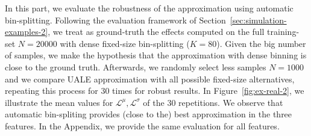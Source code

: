 \documentclass[twoside]{article}
\begin{document}
In this part, we evaluate the robustness of the approximation using
automatic bin-splitting. Following the evaluation framework of
Section~\ref{sec:simulation-examples-2}, we treat as ground-truth the
effects computed on the full training-set \(N=20000\) with dense
fixed-size bin-splitting (\(K=80\)). Given the big number of samples,
we make the hypothesis that the approximation with dense binning is
close to the ground truth. Afterwards, we randomly select less samples
\(N=1000\) and we compare UALE approximation with all possible
fixed-size alternatives, repeating this process for 30 times for
robust results. In Figure~\ref{fig:ex-real-2}, we illustrate the mean
values for \(\mathcal{L}^{\mu}, \mathcal{L}^{\sigma}\) of the 30
repetitions. We observe that automatic bin-spliting provides (close to
the) best approximation in the three features. In the Appendix, we
provide the same evaluation for all features.
\end{document}

